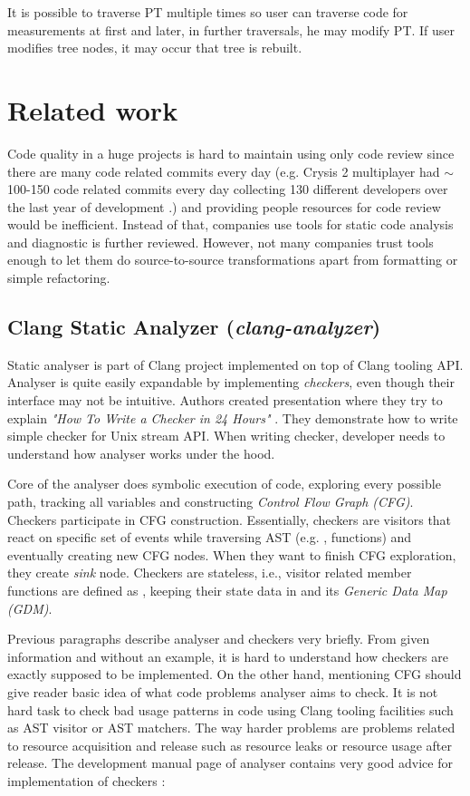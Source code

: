 It is possible to traverse PT multiple times so user can traverse code for measurements at first and later, in further traversals, he may modify PT. If user modifies tree nodes, it may occur that tree is rebuilt.

\section{Related work}
Code quality in a huge projects is hard to maintain using only code review since there are many code related commits every day (e.g. Crysis 2 multiplayer had $\sim$100-150 code related commits every day collecting 130 different developers over the last year of development \cite{crysis}.) and providing people resources for code review would be inefficient. Instead of that, companies use tools for static code analysis and diagnostic is further reviewed. However, not many companies trust tools enough to let them do source-to-source transformations apart from formatting or simple refactoring.

\subsection{Clang Static Analyzer (\emph{clang-analyzer})}
\label{clang-analyzer}
Static analyser is part of Clang project implemented on top of Clang tooling API. Analyser is quite easily expandable by implementing \emph{checkers}, even though their interface may not be intuitive. Authors created presentation where they try to explain \textit{"How To Write a Checker in 24 Hours"} \cite{clang-analyzer-presentation}. They demonstrate how to write simple checker for  Unix stream API. When writing checker, developer needs to understand how analyser works under the hood.

Core of the analyser does symbolic execution of code, exploring every possible path, tracking all variables and constructing \emph{Control Flow Graph (CFG)}. Checkers participate in CFG construction. Essentially, checkers are visitors that react on specific set of events while traversing AST (e.g. ,  functions) and eventually creating new CFG nodes. When they want to finish CFG exploration, they create \emph{sink} node. Checkers are stateless, i.e., visitor related member functions are defined as , keeping their state data in  and its \emph{Generic Data Map (GDM)}.

Previous paragraphs describe analyser and checkers very briefly. From given information and without an example, it is hard to understand how checkers are exactly supposed to be implemented. On the other hand, mentioning CFG should give reader basic idea of what code problems analyser aims to check. It is not hard task to check bad usage patterns in code using Clang tooling facilities such as AST visitor or AST matchers. The way harder problems are problems related to resource acquisition and release such as resource leaks or resource usage after release. The development manual page of analyser contains very good advice for implementation of checkers \cite{clang-analyzer-manual}:\\

